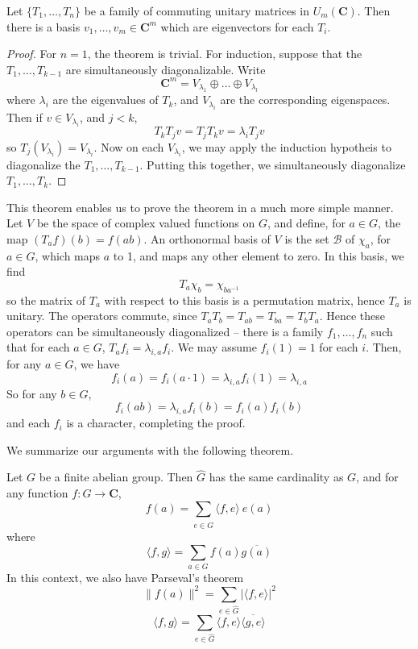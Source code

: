 \begin{theorem}
    Let $\{ T_1, \dots, T_n \}$ be a family of commuting unitary matrices in $U_m(\mathbf{C})$. Then there is a basis $v_1, \dots, v_m \in \mathbf{C}^m$ which are eigenvectors for each $T_i$.
\end{theorem}
\begin{proof}
    For $n = 1$, the theorem is trivial. For induction, suppose that the $T_1, \dots, T_{k-1}$ are simultaneously diagonalizable. Write
    \[ \mathbf{C}^m = V_{\lambda_1} \oplus \dots \oplus V_{\lambda_l} \]
    where $\lambda_i$ are the eigenvalues of $T_k$, and $V_{\lambda_i}$ are the corresponding eigenspaces. Then if $v \in V_{\lambda_i}$, and $j < k$,
    \[ T_k T_j v = T_j T_k v = \lambda_i T_j v \]
    so $T_j(V_{\lambda_i}) = V_{\lambda_i}$. Now on each $V_{\lambda_i}$, we may apply the induction hypotheis to diagonalize the $T_1, \dots, T_{k-1}$. Putting this together, we simultaneously diagonalize $T_1, \dots, T_k$.
\end{proof}

This theorem enables us to prove the theorem in a much more simple manner. Let $V$ be the space of complex valued functions on $G$, and define, for $a \in G$, the map $(T_a f)(b) = f(ab)$. An orthonormal basis of $V$ is the set $\mathcal{B}$ of $\chi_a$, for $a \in G$, which maps $a$ to 1, and maps any other element to zero. In this basis, we  find
%
\[ T_a \chi_b = \chi_{ba^{-1}} \]
%
so the matrix of $T_a$ with respect to this basis is a permutation matrix, hence $T_a$ is unitary. The operators commute, since $T_a T_b = T_{ab} = T_{ba} = T_b T_a$. Hence these operators can be simultaneously diagonalized -- there is a family $f_1, \dots, f_n$ such that for each $a \in G$, $T_a f_i = \lambda_{i,a} f_i$. We may assume $f_i(1) = 1$ for each $i$. Then, for any $a \in G$, we have
%
\[ f_i(a) = f_i(a \cdot 1) = \lambda_{i,a} f_i(1) = \lambda_{i,a} \]
%
So for any $b \in G$,
%
\[ f_i(ab) = \lambda_{i,a} f_i(b) = f_i(a) f_i(b) \]
%
and each $f_i$ is a character, completing the proof.

We summarize our arguments with the following theorem.

\begin{theorem}
    Let $G$ be a finite abelian group. Then $\hat{G}$ has the same cardinality as $G$, and for any function $f: G \to \mathbf{C}$,
    \[ f(a) = \sum_{e \in \hat{G}} \langle f, e \rangle\ e(a) \]
    where
    \[ \langle f, g \rangle = \sum_{a \in G} f(a) \overline{g(a)} \]
    In this context, we also have Parseval's theorem
    \[ \| f(a) \|^2 = \sum_{e \in \hat{G}} |\langle f, e \rangle|^2 \]
    \[ \langle f, g \rangle = \sum_{e \in \hat{G}} \langle f, e \rangle \overline{\langle g, e \rangle} \]
\end{theorem}

